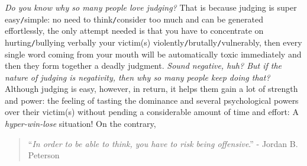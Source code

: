 \documentclass[12pt]{article}
\begin{document}
{\it Do you know why so many people love judging?} That is because judging is super easy{\tt/}simple: no need to think{\tt/}consider too much and can be generated effortlessly, the only attempt needed is that you have to concentrate on hurting{\tt/}bullying verbally your victim(s) violently{\tt/}brutally{\tt/}vulnerably, then every single word coming from your mouth will be automatically toxic immediately and then they form together a deadly judgment. {\it Sound negative, huh? But if the nature of judging is negativity, then why so many people keep doing that?} Although judging is easy, however, in return, it helps them gain a lot of strength and power: the feeling of tasting the dominance and several psychological powers over their victim(s) without pending a considerable amount of time and effort: A {\it hyper-win-lose} situation! On the contrary,
\begin{quotation}
	``{\it In order to be able to think, you have to risk being offensive}.'' - {\sc Jordan B. Peterson}
\end{quotation}
\end{document}
